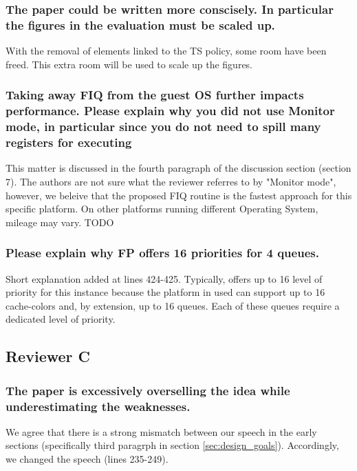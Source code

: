 

        \subsubsection{The paper could be written more conscisely. In particular the figures in the evaluation must be scaled up.}
            With the removal of elements linked to the TS policy, some room have been freed. This extra room will be used to scale up the figures.

        \subsubsection{Taking away FIQ from the guest OS further impacts performance. Please explain why you did not use Monitor mode, in particular since you do not need to spill many registers for executing}
            This matter is discussed in the fourth paragraph of the discussion section (section 7).
            The authors are not sure what the reviewer referres to by "Monitor mode", however, we beleive that the proposed FIQ routine is the fastest approach for this specific platform. On other platforms running different Operating System, mileage may vary.
            TODO

        \subsubsection{Please explain why FP offers 16 priorities for 4 queues.}
            Short explanation added at lines 424-425. Typically, \schim offers up to 16 level of priority for this instance because the platform in used can support up to 16 cache-colors and, by extension, up to 16 queues. Each of these queues require a dedicated level of priority.

    \subsection{Reviewer C}
        \subsubsection{The paper is excessively overselling the idea while underestimating the weaknesses.}
            We agree that there is a strong mismatch between our speech in the early sections (specifically third paragrph in section \ref{sec:design_goals}).
            Accordingly, we changed the speech (lines 235-249).

